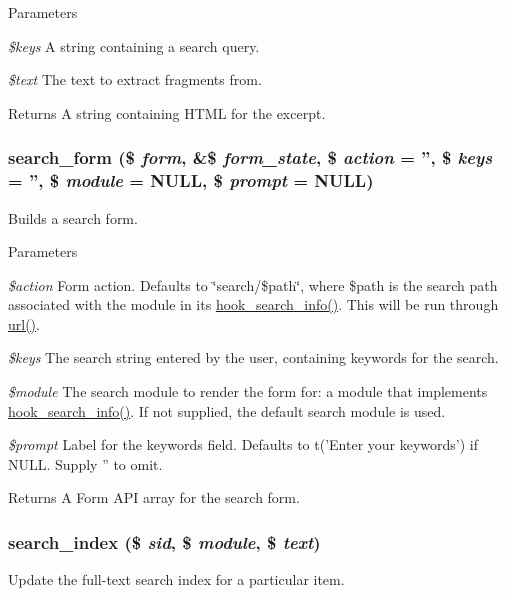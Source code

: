 \begin{DoxyParams}{Parameters}
\item[{\em \$keys}]A string containing a search query.\item[{\em \$text}]The text to extract fragments from.\end{DoxyParams}
\begin{DoxyReturn}{Returns}
A string containing HTML for the excerpt. 
\end{DoxyReturn}
\hypertarget{group__search_gae12dc9da20e7e19853dfc18f92039d98}{
\subsubsection[{search\_\-form}]{\setlength{\rightskip}{0pt plus 5cm}search\_\-form (\$ {\em form}, \/  \&\$ {\em form\_\-state}, \/  \$ {\em action} = {\ttfamily ''}, \/  \$ {\em keys} = {\ttfamily ''}, \/  \$ {\em module} = {\ttfamily NULL}, \/  \$ {\em prompt} = {\ttfamily NULL})}}
\label{group__search_gae12dc9da20e7e19853dfc18f92039d98}
Builds a search form.


\begin{DoxyParams}{Parameters}
\item[{\em \$action}]Form action. Defaults to \char`\"{}search/\$path\char`\"{}, where \$path is the search path associated with the module in its \hyperlink{group__search_ga37b761616f2cad4796891008f2b374f3}{hook\_\-search\_\-info()}. This will be run through \hyperlink{common_8inc_a43b2a0594431556db49df980801d8807}{url()}. \item[{\em \$keys}]The search string entered by the user, containing keywords for the search. \item[{\em \$module}]The search module to render the form for: a module that implements \hyperlink{group__search_ga37b761616f2cad4796891008f2b374f3}{hook\_\-search\_\-info()}. If not supplied, the default search module is used. \item[{\em \$prompt}]Label for the keywords field. Defaults to t('Enter your keywords') if NULL. Supply '' to omit.\end{DoxyParams}
\begin{DoxyReturn}{Returns}
A Form API array for the search form. 
\end{DoxyReturn}
\hypertarget{group__search_ga57ab9f6e1c404a8c248293e554373ae6}{
\subsubsection[{search\_\-index}]{\setlength{\rightskip}{0pt plus 5cm}search\_\-index (\$ {\em sid}, \/  \$ {\em module}, \/  \$ {\em text})}}
\label{group__search_ga57ab9f6e1c404a8c248293e554373ae6}
Update the full-\/text search index for a particular item.


